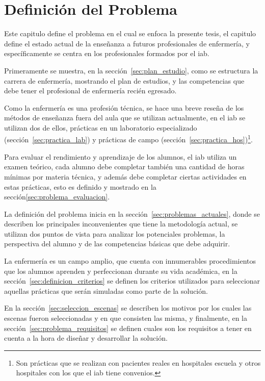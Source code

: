 \chapter{Definición del Problema}

Este capitulo define el problema en el cual se enfoca la presente tesis, el
capitulo define el estado actual de la enseñanza a futuros profesionales de
enfermería, y específicamente se centra en los profesionales formados por el
\Gls{iab}. 

Primeramente se muestra, en la sección~\ref{sec:plan_estudio}, como se
estructura la carrera de enfermería, mostrando el plan de estudios, y las
competencias que debe tener el profesional de enfermería recién egresado.

Como la enfermería es una profesión técnica, se hace una breve reseña de los
métodos de enseñanza fuera del aula que se utilizan actualmente, en el \Gls{iab}
se utilizan dos de ellos, prácticas en un laboratorio especializado
(sección~\ref{sec:practica_lab}) y prácticas de campo
(sección~\ref{sec:practica_hos})\footnote{Son prácticas que se realizan con
    pacientes reales en hospitales escuela y otros hospitales con los que el
    \Gls{iab} tiene convenios.}.

Para evaluar el rendimiento y aprendizaje de los alumnos, el \Gls{iab} utiliza
un examen teórico, cada alumno debe completar también una cantidad de horas
mínimas por materia técnica, y además debe completar ciertas actividades en
estas prácticas, esto es definido y mostrado en la
sección\ref{sec:problema_evaluacion}.

La definición del problema inicia en la sección~\ref{sec:problemas_actuales},
donde se describen los principales inconvenientes que tiene la metodología
actual, se utilizan dos puntos de vista para analizar los potenciales problemas,
la perspectiva del alumno y de las competencias básicas que debe adquirir.


La enfermería es un campo amplio, que cuenta con innumerables procedimientos que
los alumnos aprenden y perfeccionan durante su vida académica, en la
sección~\ref{sec:definicion_criterios} se definen los criterios utilizados para
seleccionar aquellas prácticas que serán simuladas como parte de la solución.

En la sección~\ref{sec:seleccion_escenas} se describen los motivos por los
cuales las escenas fueron seleccionadas y en que consisten las misma, y
finalmente, en la sección~\ref{sec:problema_requisitos} se definen cuales son
los requisitos a tener en cuenta a la hora de diseñar y desarrollar la
solución.









